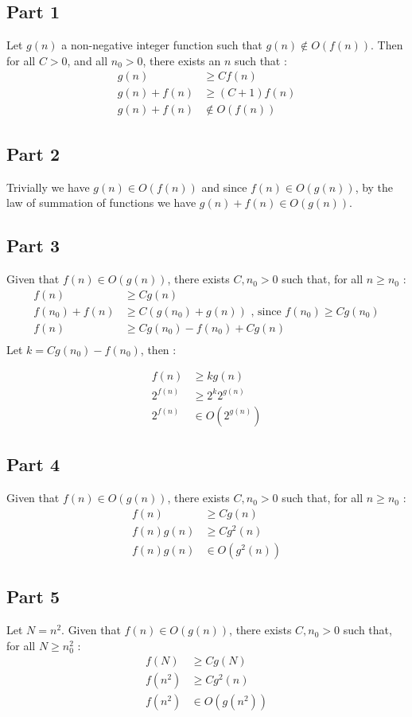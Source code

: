 \subsection*{Part 1}
Let $g(n)$ a non-negative integer function such that $g(n) \notin O(f(n))$. Then for all $C > 0$, and all $n_0 > 0$, there exists an $n$ such that :
\begin{align*}
g(n) & \geq C f(n) \\
g(n) + f(n) & \geq (C+1) f(n) \\
g(n) + f(n) & \notin O(f(n))
\end{align*}

\subsection*{Part 2}
Trivially we have $g(n) \in O(f(n))$ and since $f(n) \in O(g(n))$, by the law of summation of functions we have $g(n) + f(n) \in O(g(n))$. 

\subsection*{Part 3}
Given that $f(n) \in O(g(n))$, there exists $C,n_0 > 0$ such that, for all $n \geq n_0$ :
\begin{align*}
f(n) & \geq C g(n) \\
f(n_0) + f(n) & \geq C (g(n_0) + g(n)) \text{  , since $f(n_0) \geq C g(n_0)$} \\
f(n) & \geq C g(n_0) - f(n_0) + C g(n) \\
\end{align*}
Let $k = C g(n_0) - f(n_0)$, then :

\begin{align*}
f(n) & \geq k g(n) \\
2^{f(n)} & \geq 2^k 2^{g(n)} \\
2^{f(n)} & \in O(2^{g(n)})
\end{align*}

\subsection*{Part 4}
Given that $f(n) \in O(g(n))$, there exists $C,n_0 > 0$ such that, for all $n \geq n_0$ :
\begin{align*}
f(n) & \geq C g(n) \\
f(n)g(n) & \geq C g^2(n) \\
f(n)g(n) & \in O(g^2(n)) 
\end{align*}

\subsection*{Part 5}
Let $N = n^2$. Given that $f(n) \in O(g(n))$, there exists $C,n_0 > 0$ such that, for all $N \geq n_0^2$ :
\begin{align*}
f(N) & \geq C g(N) \\
f(n^2) & \geq C g^2(n) \\
f(n^2) & \in O(g(n^2)) 
\end{align*}